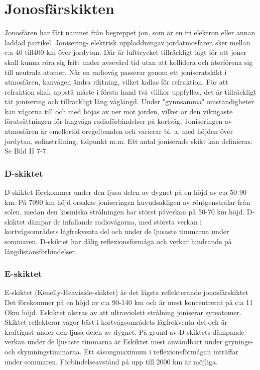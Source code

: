 \section{Jonosfärskikten}

Jonosfären har fått namnet från begreppet
jon, som är en fri elektron eller annan laddad
partikel. Jonisering- elektrisk uppladdningav jordatmosfären sker mellan c:a 40 till400
km över jordytan. Där är lufttrycket tillräckligt
lågt för att joner skall kunna röra sig fritt
under avsevärd tid utan att kollidera och
återförena sig till neutrala atomer.
När en radiovåg passerar genom ett
joniseratskikt i atmosfären, kanvågen ändra
riktning, vilket kallas för refraktion. För att
refraktion skall uppstå måste i första hand
två villkor uppfyllas, det är tillräckligt tät jonisering och tillräckligt lång våglängd. Under
"gynnsamma" omständigheter kan vågorna
till och med böjas av ner mot jorden, vilket är
den viktigaste förutsättningen för långväga
radioförbindelser på kortvåg.
Joniseringen av atmosfären är emellertid
oregelbunden och varierar bl. a. med höjden
över jordytan, solinstrålning, tidpunkt m.m.
Ett antal joniserade skikt kan definieras.
Se Bild II 7-7.

\subsubsection{D-skiktet}
D-skiktet förekommer under den ljusa delen
av dygnet på en höjd av c:a 50-90 km. På 7090 km höjd orsakas joniseringen huvudsakligen av röntgenstrålar från solen, medan
den kosmiska strålningen har störst påverkan på 50-70 km höjd. D-skiktet dämpar de
infallande radiovågorna, med största verkan
i kortvågsområdets lågfrekventa del och under de ljusaste timmarna under sommaren.
D-skiktet har dålig reflexionsförmåga och
verkar hindrande på långdistansförbindelser.

\subsubsection{E-skiktet}
E-skiktet (Kenelly-Heaviside-skiktet) är det
lägsta reflekterande jonosfärskiktet Det förekommer på en höjd av c:a 90-140 km och
är mest koncentrerat på c:a 11 Okm höjd. Eskiktet alstras av att ultraviolett strålning
joniserar syreatomer. Skiktet reflekterar vågor bäst i kortvågsområdets lågfrekventa del
och är kraftigast under den ljusa delen av
dygnet. På grund av D-skiktets dämpande
verkan under de ljusaste timmarna är Eskiktet mest användbart under grynings- och
skymningstimmarna.
Ett säsongmaximum i reflexionsförmågan inträffar under sommaren. Förbindelseavstånd på upp till 2000 km är möjliga.

